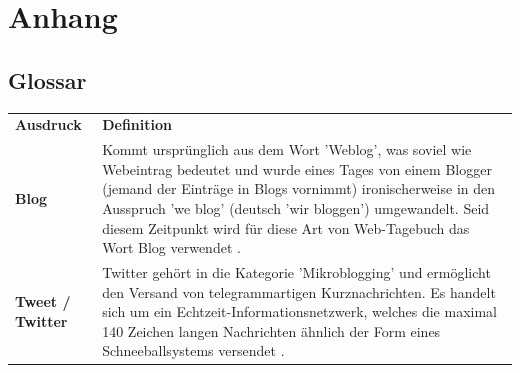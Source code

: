 %
%


\appendix
\chapter{Anhang}\label{chap.anhang}
\section{Glossar}\label{sec.glossar}
\begin{table}[ht] \centering
	\begin{tabular}{b{4cm} m{11cm} }	
		\rowcolor{gray} 
		
		\textbf{Ausdruck} & \textbf{Definition} \\ 
		\textbf{Blog} & Kommt ursprünglich aus dem Wort 'Weblog', was soviel wie Webeintrag bedeutet und wurde eines Tages von einem Blogger (jemand der Einträge in Blogs vornimmt) ironischerweise in den Ausspruch 'we blog' (deutsch 'wir bloggen') umgewandelt. Seid diesem Zeitpunkt wird für diese Art von Web-Tagebuch das Wort Blog verwendet \cite{Kaplan:2012}.  \\ 
		\textbf{Tweet / Twitter} & Twitter gehört in die Kategorie 'Mikroblogging' und ermöglicht den Versand von telegrammartigen Kurznachrichten. Es handelt sich um ein Echtzeit-Informationsnetzwerk, welches die maximal 140 Zeichen langen Nachrichten ähnlich der Form eines Schneeballsystems versendet \cite{Twitter:2012}. \\ 
	
	\end{tabular}
	\label{tab:glossar}
\end{table}

